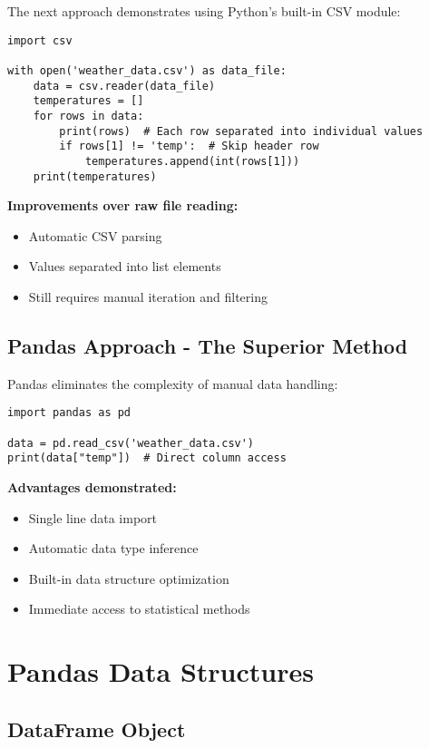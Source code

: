 \documentclass[12pt]{article}
\begin{document}
The next approach demonstrates using Python's built-in CSV module:

\begin{lstlisting}
import csv

with open('weather_data.csv') as data_file:
    data = csv.reader(data_file)
    temperatures = []
    for rows in data:
        print(rows)  # Each row separated into individual values
        if rows[1] != 'temp':  # Skip header row
            temperatures.append(int(rows[1]))
    print(temperatures)
\end{lstlisting}

\textbf{Improvements over raw file reading:}
\begin{itemize}
    \item Automatic CSV parsing
    \item Values separated into list elements
    \item Still requires manual iteration and filtering
\end{itemize}

\subsection{Pandas Approach - The Superior Method}

Pandas eliminates the complexity of manual data handling:

\begin{lstlisting}
import pandas as pd

data = pd.read_csv('weather_data.csv')
print(data["temp"])  # Direct column access
\end{lstlisting}

\textbf{Advantages demonstrated:}
\begin{itemize}
    \item Single line data import
    \item Automatic data type inference
    \item Built-in data structure optimization
    \item Immediate access to statistical methods
\end{itemize}

\section{Pandas Data Structures}

\subsection{DataFrame Object}
\end{document}
